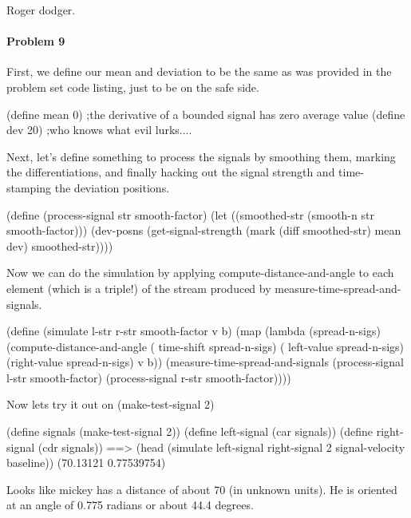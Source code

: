 Roger dodger.

\paragraph{Problem 9}

First, we define our mean and deviation to be the same as was provided in the
problem set code listing, just to be on the safe side.

\beginlisp
(define mean 0) ;the derivative of a bounded signal has zero average value
(define dev 20) ;who knows what evil lurks....
\endlisp

Next, let's define something to process the signals by smoothing
them, marking the differentiations, and finally hacking out the signal strength
and time-stamping the deviation positions.

\beginlisp
(define (process-signal str smooth-factor)
  (let ((smoothed-str (smooth-n str smooth-factor)))
    (dev-posns (get-signal-strength (mark (diff smoothed-str) mean dev)
                                    smoothed-str))))
\endlisp

Now we can do the simulation by applying {\cf compute-distance-and-angle} to
each element (which is a triple!) of the stream produced by {\cf
measure-time-spread-and-signals}.

\beginlisp
(define (simulate l-str r-str smooth-factor v b)
  (map (lambda (spread-n-sigs) (compute-distance-and-angle ( time-shift spread-n-sigs)
                                                           ( left-value spread-n-sigs)
                                                           (right-value spread-n-sigs)
                                                           v b))
       (measure-time-spread-and-signals (process-signal l-str smooth-factor)
                                        (process-signal r-str smooth-factor))))
\endlisp

Now lets try it out on (make-test-signal 2)

\beginlisp
(define       signals (make-test-signal 2))
(define  left-signal  (car signals))
(define right-signal  (cdr signals))
\null
==> (head (simulate left-signal right-signal 2 signal-velocity baseline))
(70.13121 0.77539754)
\endlisp

Looks like mickey has a distance of about 70 (in unknown units).
He is oriented at an angle of 0.775 radians or about 44.4 degrees.


